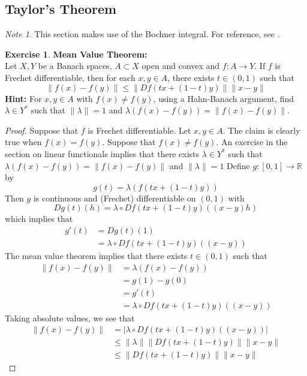 \documentclass[12pt]{amsart}
\theoremstyle{definition}
\theoremstyle{remark}
\newtheorem{note}[remark]{Note}
\theoremstyle{definition}
\newtheorem{ex}[definition]{Exercise}
\newcommand{\lam}{\lambda}
\newcommand{\R}{\mathbb{R}}
\begin{document}
	
	
	
	
	
	
	\newpage
	\subsection{Taylor's Theorem}	
	
	\begin{note}
	This section makes use of the Bochner integral. For reference, see .
	\end{note}
	\begin{ex}\textbf{Mean Value Theorem:}\\
	Let $X, Y$ be a Banach spaces, $A \subset X$ open and convex and $f:A \rightarrow Y$. If $f$ is Frechet differentiable, then for each $x,y \in A$, there exists $t \in (0,1)$ such that $$\|f(x) - f(y)\| \leq \|Df(tx + (1-t)y)\|\|x-y\|$$
	\textbf{Hint:} For $x,y \in A$ with $f(x) \neq f(y)$, using a Hahn-Banach argument, find $\lam \in Y^*$ such that $\|\lam\| = 1 $ and $\lam (f(x) - f(y)) = \|f(x) - f(y)\|$.
	\end{ex}
	
	\begin{proof}
	Suppose that $f$ is Frechet differentiable. Let $x,y \in A$. The claim is clearly true when $f(x) = f(y)$. Suppose that $f(x) \neq f(y)$. An exercise in the section on linear functionals implies that there exists $\lam \in Y^*$ such that $\lam(f(x)-f(y)) = \| f(x) - f(y)\|$ and $\|\lam \| = 1$
	Define $g:[0,1] \rightarrow \R$ by $$g(t) = \lam(f(tx +(1-t)y))$$ Then $g$ is continuous and (Frechet) differentiable on $(0,1)$ with $$Dg(t)(h) = \lam \circ Df(tx+(1-t)y)((x-y)h)$$ which implies that
	\begin{align*}
	g'(t) 
	&= Dg(t)(1)\\
	&= \lam \circ Df(tx+(1-t)y)((x-y))
	\end{align*}
	The mean value theorem implies that there exists $t \in (0,1)$ such that 
	\begin{align*}
	\|f(x) - f(y)\|
	&= \lam(f(x) - f(y)) \\
	&= g(1) - g(0) \\
	&= g'(t)\\
	&= \lam \circ Df(tx+(1-t)y)((x-y))
	\end{align*}
	Taking absolute values, we see that 
	\begin{align*}
	\|f(x) - f(y)\|
	&= |\lam \circ Df(tx+(1-t)y)((x-y))| \\
	& \leq \|\lam \| \|Df(tx+(1-t)y)\|\|x-y\| \\
	& \leq \|Df(tx+(1-t)y)\|\|x-y\|
	\end{align*}
	\end{proof}
	
\end{document}
